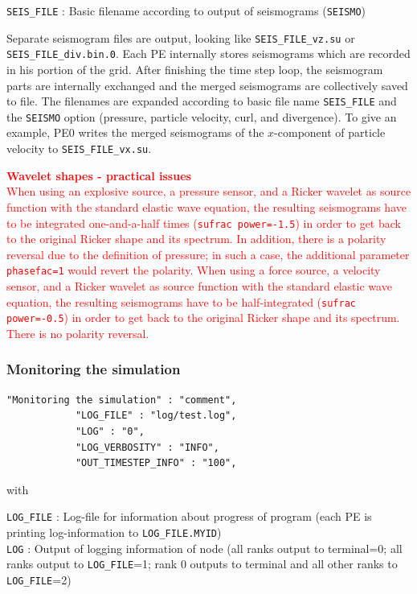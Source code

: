 \texttt{SEIS\_FILE} : Basic filename according to output of seismograms (\texttt{SEISMO})

Separate seismogram files are output, looking like \texttt{SEIS\_FILE\_vz.su} or \texttt{SEIS\_FILE\_div.bin.0}. Each PE internally stores seismograms which are recorded in his portion of the grid. After finishing the time step loop, the seismogram parts are internally exchanged and the merged seismograms are collectively saved to file. The filenames are expanded according to basic file name \texttt{SEIS\_FILE} and the \texttt{SEISMO} option (pressure, particle velocity, curl, and divergence). To give an example, PE0 writes the merged seismograms of the $x$-component of particle velocity to \texttt{SEIS\_FILE\_vx.su}.

\textcolor{red}{\textbf{Wavelet shapes - practical issues}\\
When using an explosive source, a pressure sensor, and a Ricker wavelet as
source function with the standard elastic wave equation, the
resulting seismograms have to be integrated one-and-a-half times (\texttt{sufrac power=-1.5}) in order to get back to the original Ricker shape and its spectrum. In addition, there is a polarity reversal due to the definition of pressure; in such a case, the additional parameter \texttt{phasefac=1} would revert the polarity. When using a force source, a velocity sensor, and a Ricker wavelet as source function with the standard elastic wave equation, the resulting seismograms have to be half-integrated (\texttt{sufrac power=-0.5}) in order to get back to the original Ricker shape and its spectrum. There is no polarity reversal.}

\subsubsection{Monitoring the simulation}
\begin{verbatim}
"Monitoring the simulation" : "comment",
            "LOG_FILE" : "log/test.log",
            "LOG" : "0",
            "LOG_VERBOSITY" : "INFO",
            "OUT_TIMESTEP_INFO" : "100",
\end{verbatim}

with

\texttt{LOG\_FILE} : Log-file for information about progress of program (each PE is printing log-information to \texttt{LOG\_FILE.MYID})\\
\texttt{LOG} : Output of logging information of node (all ranks output to terminal=0; all ranks output to \texttt{LOG\_FILE}=1; rank 0 outputs to terminal and all other ranks to \texttt{LOG\_FILE}=2)

